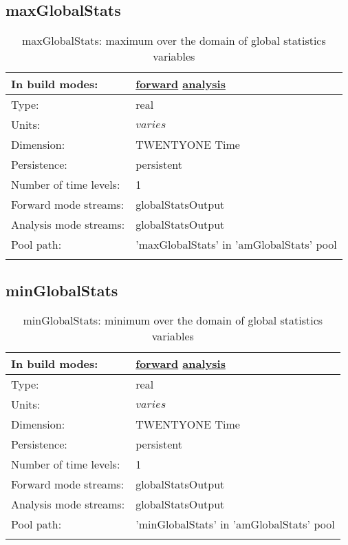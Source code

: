 \subsection[maxGlobalStats]{maxGlobalStats}
\label{subsec:var_sec_amGlobalStats_maxGlobalStats}
\begin{center}
\begin{longtable}{| p{2.0in} | p{4.0in} |}
        \hline 
        In build modes: & \hyperref[subsec:forward_var_tab_amGlobalStats]{forward} \hyperref[subsec:analysis_var_tab_amGlobalStats]{analysis} \\
        \hline 
        Type: & real \\
        \hline 
        Units: & $varies$ \\
        \hline 
        Dimension: & TWENTYONE Time \\
        \hline 
        Persistence: & persistent \\
        \hline 
        Number of time levels: & 1 \\
        \hline 
		 Forward mode streams: &  globalStatsOutput \\
        \hline 
		 Analysis mode streams: &  globalStatsOutput \\
        \hline 
            Pool path: & 'maxGlobalStats' in 'amGlobalStats' pool
 \\
		 \hline 
    \caption{maxGlobalStats: maximum over the domain of global statistics variables}
\end{longtable}
\end{center}
\subsection[minGlobalStats]{minGlobalStats}
\label{subsec:var_sec_amGlobalStats_minGlobalStats}
\begin{center}
\begin{longtable}{| p{2.0in} | p{4.0in} |}
        \hline 
        In build modes: & \hyperref[subsec:forward_var_tab_amGlobalStats]{forward} \hyperref[subsec:analysis_var_tab_amGlobalStats]{analysis} \\
        \hline 
        Type: & real \\
        \hline 
        Units: & $varies$ \\
        \hline 
        Dimension: & TWENTYONE Time \\
        \hline 
        Persistence: & persistent \\
        \hline 
        Number of time levels: & 1 \\
        \hline 
		 Forward mode streams: &  globalStatsOutput \\
        \hline 
		 Analysis mode streams: &  globalStatsOutput \\
        \hline 
            Pool path: & 'minGlobalStats' in 'amGlobalStats' pool
 \\
		 \hline 
    \caption{minGlobalStats: minimum over the domain of global statistics variables}
\end{longtable}
\end{center}
